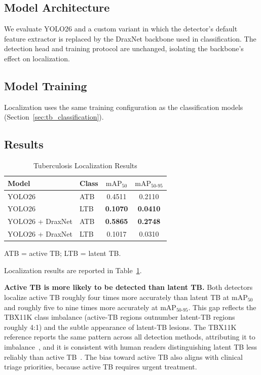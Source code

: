 \documentclass[conference, letterpaper]{IEEEtran}
\begin{document}
\subsection{Model Architecture}

We evaluate YOLO26 and a custom variant in which the detector's default feature extractor is replaced by the DraxNet backbone used in classification. The detection head and training protocol are unchanged, isolating the backbone's effect on localization.

\subsection{Model Training}

Localization uses the same training configuration as the classification models (Section~\ref{sec:tb_classification}).

\subsection{Results}

\begin{table}[!ht]
\renewcommand{\arraystretch}{1.2}
\centering
\begin{threeparttable}
\caption{Tuberculosis Localization Results}
\label{tab:detection_results}
\small
\begin{tabular}{@{}l l c c@{}}
\toprule
\textbf{Model} & \textbf{Class} & \textbf{$\mathrm{mAP}_{50}$} & \textbf{$\mathrm{mAP}_{50\text{-}95}$} \\
\midrule
YOLO26                    & ATB & 0.4511 & 0.2110 \\
YOLO26                    & LTB & \textbf{0.1070} & \textbf{0.0410} \\
\midrule
YOLO26 + DraxNet & ATB & \textbf{0.5865} & \textbf{0.2748} \\
YOLO26 + DraxNet & LTB & 0.1017 & 0.0310 \\
\bottomrule
\end{tabular}
\begin{tablenotes}[flushleft]
\footnotesize
\item ATB = active TB; LTB = latent TB.
\end{tablenotes}
\end{threeparttable}
\end{table}

Localization results are reported in Table~\ref{tab:detection_results}.


\textbf{Active TB is more likely to be detected than latent TB.}
Both detectors localize active TB roughly four times more accurately than latent TB at $\mathrm{mAP}_{50}$ and roughly five to nine times more accurately at $\mathrm{mAP}_{50\text{-}95}$. This gap reflects the TBX11K class imbalance (active-TB regions outnumber latent-TB regions roughly 4:1) and the subtle appearance of latent-TB lesions. The TBX11K reference reports the same pattern across all detection methods, attributing it to imbalance~\cite{liu2023tbx11k_pami}, and it is consistent with human readers distinguishing latent TB less reliably than active TB~\cite{choi2023tb_activity}. The bias toward active TB also aligns with clinical triage priorities, because active TB requires urgent treatment.
\end{document}

